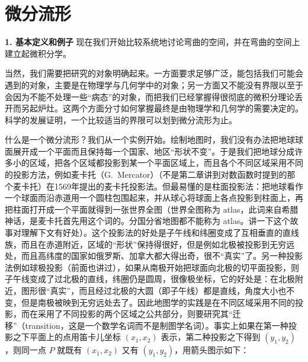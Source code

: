 \section{微分流形}

\noindent\textbf{1. 基本定义和例子}\quad
现在我们开始比较系统地讨论弯曲的空间，并在弯曲的空间上建立起微积分学。

当然，我们需要把研究的对象明确起来。一方面要求足够广泛，能包括我们可能会遇到的对象，主要是在物理学与几何学中的对象；另一方面又不能没有界限以至于会因为不能不处理一些“病态”的对象，而把我们已经掌握得很彻底的微积分理论丢开而另起炉灶。这两个方面分寸如何掌握最终是由物理学和几何学的需要决定的。科学的发展证明，一个比较适当的界限可以划到微分流形为止。

什么是一个微分流形？我们从一个实例开始。绘制地图时，我们没有办法把地球球面展开成一个平面而且保持每一个国家、地区“形状不变”。于是我们把地球分成许多小的区域，把各个区域都投影到某一个平面区域上，而且各个不同区域采用不同的投影方法，例如麦卡托（G.~Mercator）（不是第二章讲到对数函数时提到的那个麦卡托）在1569年提出的麦卡托投影法。但最易懂的是柱面投影法：把地球看作一个球面而沿赤道用一个圆柱包围起来，并从球心将球面上各点投影到柱面上，再把柱面打开成一个平面就得到一张世界全图（世界全图称为 atlas，此词来自希腊神话，是麦卡托首先用这个词的。分国分省地图都不能称为 atlas。讲一下这个故事对理解下文有好处）。这个投影法的好处是子午线和纬圈变成了互相垂直的直线族，而且在赤道附近，区域的“形状”保持得很好，但是例如北极被投影到无穷远处，而且高纬度的国家如俄罗斯、加拿大都大得出奇，很不“真实”了。另一种投影法例如球极投影（前面也讲过），如果从南极开始把球面向北极的切平面投影，则子午线变成了过北极的直线，纬圈仍是圆周，很像极坐标，它的好处是：在北极附近，图形很“真实”，而且经过北极的大圆（即子午线）都是直线，角度大小也不变，但是南极被映到无穷远处去了。因此地图学的实践是在不同区域采用不同的投影，而在采用了不同投影的两个区域之公共部分，则要研究其“迁移”（transition，这是一个数学名词而不是制图学名词）。事实上如果在第一种投影之下平面上的点用笛卡儿坐标 $(x_1,x_2)$ 表示，第二种投影之下得到 $(y_1,y_2)$，则同一点 $P$ 就既有 $(x_1,x_2)$ 又有 $(y_1,y_2)$，用箭头图示如下：

\begin{figure}[htbp]
\centering
{}
\end{figure}


